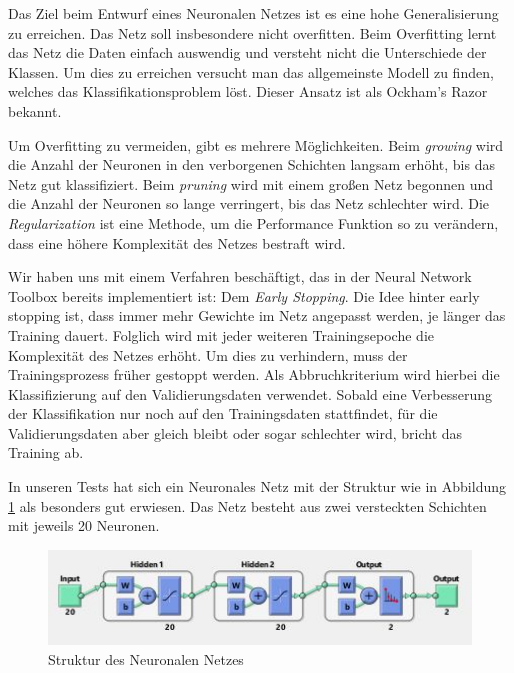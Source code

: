 Das Ziel beim Entwurf eines Neuronalen Netzes ist es eine hohe Generalisierung zu erreichen. Das Netz soll insbesondere nicht overfitten. Beim Overfitting lernt das Netz die Daten einfach auswendig und versteht nicht die Unterschiede der Klassen. Um dies zu erreichen versucht man das allgemeinste Modell zu finden, welches das Klassifikationsproblem löst. Dieser Ansatz ist als Ockham's Razor bekannt.

Um Overfitting zu vermeiden, gibt es mehrere Möglichkeiten. Beim \textit{growing} wird die Anzahl der Neuronen in den verborgenen Schichten langsam erhöht, bis das Netz gut klassifiziert. Beim \textit{pruning} wird mit einem großen Netz begonnen und die Anzahl der Neuronen so lange verringert, bis das Netz schlechter wird. Die \textit{Regularization} ist eine Methode, um die Performance Funktion so zu verändern, dass eine höhere Komplexität des Netzes bestraft wird. 

Wir haben uns mit einem Verfahren beschäftigt, das in der Neural Network Toolbox bereits implementiert ist: Dem \textit{Early Stopping}. Die Idee hinter early stopping ist, dass immer mehr Gewichte im Netz angepasst werden, je länger das Training dauert. Folglich wird mit jeder weiteren Trainingsepoche die Komplexität des Netzes erhöht. Um dies zu verhindern, muss der Trainingsprozess früher gestoppt werden. Als Abbruchkriterium wird hierbei die Klassifizierung auf den Validierungsdaten verwendet. Sobald eine Verbesserung der Klassifikation nur noch auf den Trainingsdaten stattfindet, für die Validierungsdaten aber gleich bleibt oder sogar schlechter wird, bricht das Training ab.

In unseren Tests hat sich ein Neuronales Netz mit der Struktur wie in Abbildung \ref{fig:NNStructure} als besonders gut erwiesen. Das Netz besteht aus zwei versteckten Schichten mit jeweils 20 Neuronen.

\begin{figure}[!h] \label{NNStructure}
    \centering
    \includegraphics[width=1\textwidth]{pics/NN-Structure.JPG}
    \caption{Struktur des Neuronalen Netzes}
    \label{fig:NNStructure}
\end{figure}

